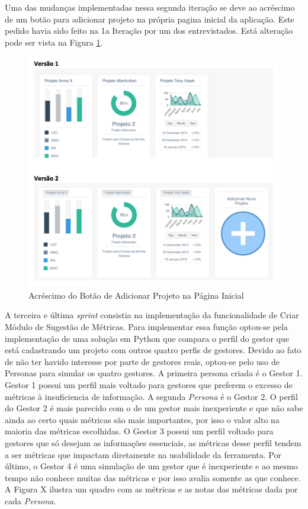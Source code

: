  Uma das mudanças implementadas nessa segunda iteração se deve ao acréscimo de um botão para adicionar projeto na própria pagina inicial da aplicação. Este pedido havia sido feito na 1a Iteração por um dos entrevistados. Está alteração pode ser vista na Figura \ref{img:compara_botao}.
 
 
 \graphicspath{{figuras/}}
 \begin{figure}[h!]
 \centering
 \includegraphics[scale=0.60]{compara_adicao_botao}
 \caption{Acréscimo do Botão de Adicionar Projeto na Página Inicial}
 \label{img:compara_botao}
 \end{figure}
 

A terceira e última \textit{sprint} consistia na implementação da funcionalidade de Criar Módulo de Sugestão de Métricas. Para implementar essa função optou-se pela implementação de uma solução em Python que compara o perfil do gestor que está cadastrando um projeto com outros quatro perfis de gestores. Devido ao fato de não ter havido interesse por parte de gestores reais, optou-se pelo uso de Personas para simular os quatro gestores. A primeira persona criada é o Gestor 1. Gestor 1 possui um perfil mais voltado para gestores que preferem o excesso de métricas à insuficiencia de informação. A segunda \textit{Persona} é o Gestor 2. O perfil do Gestor 2 é mais parecido com o de um gestor mais inexperiente e que não sabe ainda ao certo quais métricas são mais importantes, por isso o valor alto na maioria das métricas escolhidas. O Gestor 3 possui um perfil voltado para gestores que só desejam as informações essenciais, as métricas desse perfil tendem a ser métricas que impactam diretamente na usabilidade da ferramenta. Por último, o Gestor 4 é uma simulação de um gestor que é inexperiente e ao mesmo tempo não conhece muitas das métricas e por isso avalia somente as que conhece. A Figura X ilustra um quadro com as métricas e as notas das métricas dada por cada \textit{Persona}. 


